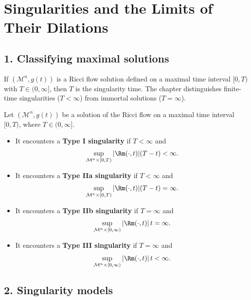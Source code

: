 \chapter{Singularities and the Limits of Their Dilations}

\section*{1. Classifying maximal solutions}

\begin{remark}
\label{ch08-rem-singularity-time-maximal-solutions}

If \((\mathcal M^n,g(t))\) is a Ricci flow solution defined on a maximal time interval \([0,T)\) with \(T\in(0,\infty]\), then \(T\) is the singularity time. The chapter distinguishes finite-time singularities (\(T<\infty\)) from immortal solutions (\(T=\infty\)).
\end{remark}

\begin{definition}
\label{ch08-def-singularity-types}

Let \((\mathcal M^n,g(t))\) be a solution of the Ricci flow on a maximal time interval \( [0,T)\), where \(T\in(0,\infty]\).
\begin{itemize}
\item It encounters a \textbf{Type I singularity} if \(T<\infty\) and
\[
\sup_{\mathcal M^n\times[0,T)} |\Rm(\cdot,t)|(T-t)<\infty.
\]
\item It encounters a \textbf{Type IIa singularity} if \(T<\infty\) and
\[
\sup_{\mathcal M^n\times[0,T)} |\Rm(\cdot,t)|(T-t)=\infty.
\]
\item It encounters a \textbf{Type IIb singularity} if \(T=\infty\) and
\[
\sup_{\mathcal M^n\times[0,\infty)} |\Rm(\cdot,t)|\,t=\infty.
\]
\item It encounters a \textbf{Type III singularity} if \(T=\infty\) and
\[
\sup_{\mathcal M^n\times[0,\infty)} |\Rm(\cdot,t)|\,t<\infty.
\]
\end{itemize}
\end{definition}

\section*{2. Singularity models}

